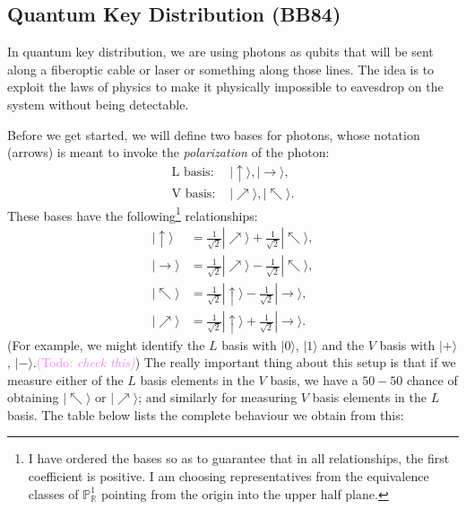 \documentclass{article}
\theoremstyle{plain}
\theoremstyle{definition}
\theoremstyle{remark}
\numberwithin{theorem}{section}
\newcommand{\KS}[1]{\textcolor{violet}{{\sf (Todo:} {\sl{#1})}}}
\newcommand{\KS}[1]{}
\newcommand{\RR}{\mathbb{R}}
\newcommand{\PP}{\mathbb{P}}
\begin{document}
\subsection{Quantum Key Distribution (BB84)}

\newcommand\upket{| \uparrow\rangle}
\newcommand\downket{| \downarrow\rangle}
\newcommand\neket{| \nearrow\rangle}
\newcommand\nwket{| \nwarrow\rangle}

In quantum key distribution, we are using photons as qubits that will be sent along a fiberoptic cable or laser or something along those lines.  The idea is to exploit the laws of physics to make it physically impossible to eavesdrop on the system without being detectable.

Before we get started, we will define two bases for photons, whose notation (arrows) is meant to invoke the \emph{polarization} of the photon:
\begin{align*}
\text{L basis:  }& |\uparrow \rangle , | \rightarrow \rangle, \\
\text{V basis:  }& | \nearrow \rangle, |\nwarrow \rangle.
\end{align*}
These bases have the following\footnote{I have ordered the bases so as to guarantee that in all relationships, the first coefficient is positive.  I am choosing representatives from the equivalence classes of $\PP^1_\RR$ pointing from the origin into the upper half plane.} relationships:
\begin{align*}
| \uparrow \rangle &= \frac{1}{\sqrt{2}} | \nearrow \rangle + \frac{1}{\sqrt{2}} | \nwarrow \rangle, \\
| \rightarrow \rangle &= \frac{1}{\sqrt{2}} | \nearrow \rangle - \frac{1}{\sqrt{2}} | \nwarrow \rangle, \\
| \nwarrow \rangle &= \frac{1}{\sqrt{2}} | \uparrow \rangle - \frac{1}{\sqrt{2}} | \rightarrow \rangle, \\
| \nearrow \rangle &= \frac{1}{\sqrt{2}} | \uparrow \rangle + \frac{1}{\sqrt{2}} | \rightarrow \rangle.
\end{align*}
(For example, we might identify the $L$ basis with $|0\rangle$, $|1 \rangle$ and the $V$ basis with $|+\rangle$, $|-\rangle$.\KS{check this})
The really important thing about this setup is that if we measure either of the $L$ basis elements in the $V$ basis, we have a $50-50$ chance of obtaining $|\nwarrow\rangle$ or $|\nearrow\rangle$; and similarly for measuring $V$ basis elements in the $L$ basis.  The table below lists the complete behaviour we obtain from this:
\vspace{1em}
\end{document}
